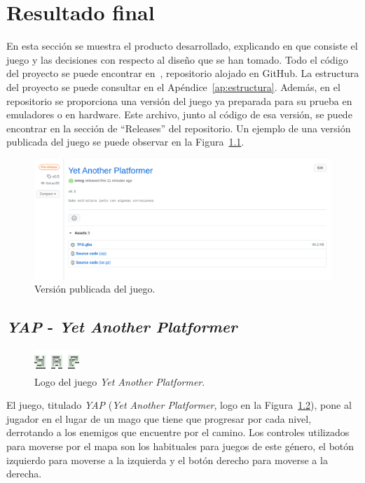 \chapter{Resultado final}\label{sec:final}
En esta sección se muestra el producto desarrollado, explicando en que consiste el juego y las decisiones con respecto al diseño que se han tomado. Todo el código del proyecto se puede encontrar en~\cite{bib:repositorio}, repositorio alojado en GitHub. La estructura del proyecto se puede consultar en el Apéndice~\ref{ap:estructura}. Además, en el repositorio se proporciona una versión del juego ya preparada para su prueba en emuladores o en hardware. Este archivo, junto al código de esa versión, se puede encontrar en la sección de ``Releases'' del repositorio. Un ejemplo de una versión publicada del juego se puede observar en la Figura~\ref{fig:release}.

\begin{figure}[h]
	\centering
	\includegraphics[width=.8\textwidth]{capitulos/capitulo6/release.png}
	\caption{Versión publicada del juego.}\label{fig:release}
\end{figure}
\FloatBarrier{}

\section{\textit{YAP} - \textit{Yet Another Platformer}}

\begin{figure}[b]
	\centering
	\includegraphics[width=.5\textwidth]{capitulos/capitulo6/logo.png}
	\caption{Logo del juego \textit{Yet Another Platformer}.}\label{fig:logo}
\end{figure}

El juego, titulado \textit{YAP} (\textit{Yet Another Platformer}, logo en la Figura~\ref{fig:logo}), pone al jugador en el lugar de un mago que tiene que progresar por cada nivel, derrotando a los enemigos que encuentre por el camino. Los controles utilizados para moverse por el mapa son los habituales para juegos de este género, el botón izquierdo para moverse a la izquierda y el botón derecho para moverse a la derecha.

